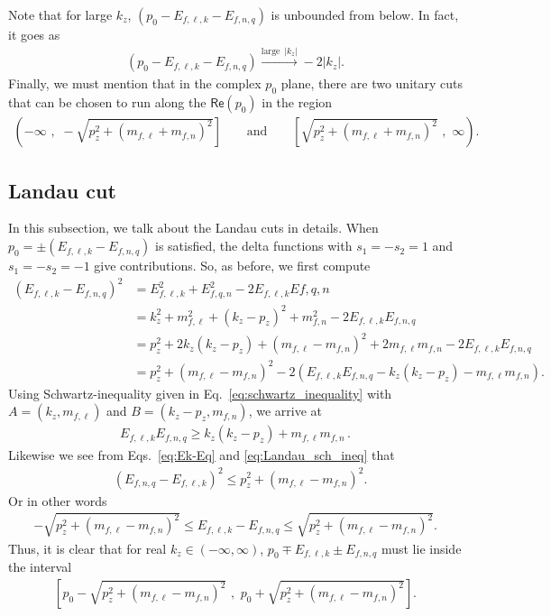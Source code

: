 \documentclass[aps,prd,floatfix,showpacs,showkeys,superscriptadress,unsortedaddress,nofootinbib,onecolumn]{revtex4-1}
\newcommand{\nn}{\nonumber \\}
\begin{document}
Note that for large  $k_z$, $(p_0-E_{f,\ell,k}-E_{f,n,q})$ is unbounded from below.  In fact,  it goes as
\begin{align}
(p_0 - E_{f,\ell,k}-E_{f,n,q}) \xrightarrow{\text{large }\,|k_z|} -2|k_z|.
\end{align} 
Finally,  we must mention that in the complex $p_0$ plane, there are two unitary cuts that can be chosen to run along the $\textsf{Re}(p_0)$ in the region 
\begin{align}
\left(\left.-\infty\,\,,\,\,-\sqrt{p^2_z+\left(m_{f,\ell}+m_{f,n}\right)^2}\right.\right]\qquad\text{and}\qquad \left[\left.\sqrt{p^2_z+\left(m_{f,\ell}+m_{f,n}\right)^2}\,\,,\,\,\infty\right.\right).
\end{align} 
\subsection{Landau cut} 
\label{app:landau_cut}
In this subsection, we talk about the Landau cuts in details. When $p_0 = \pm(E_{f,\ell,k}-E_{f,n,q})$ is satisfied, the delta functions with $s_1 =-s_2=1$ and $s_1=-s_2=-1$ give  contributions. So, as before, we first compute
\begin{align}
(E_{f,\ell,k}-E_{f,n,q})^2 &= E_{f,\ell,k}^2+E_{f,q,n}^2-2 E_{f,\ell,k}E{f,q,n} \nn
&= k_z^2+m^2_{f,\ell}+(k_z-p_z)^2+m^2_{f,n}-2 E_{f,\ell,k} E_{f,n,q} \nn
&= p^2_z+2 k_z (k_z-p_z)+(m_{f,\ell}-m_{f,n})^2 + 2m_{f,\ell}m_{f,n}-2 E_{f,\ell,k} E_{f,n,q} \nn
&= p^2_z+(m_{f,\ell}-m_{f,n})^2 - 2 ( E_{f,\ell,k} E_{f,n,q}- k_z (k_z-p_z)-m_{f,\ell}m_{f,n}).
\label{eq:Ek-Eq}
\end{align}
Using Schwartz-inequality given in Eq.~\eqref{eq:schwartz_inequality} with $A=(k_z,m_{f,\ell})$ and $B=(k_z-p_z,m_{f,n})$, we arrive at
\begin{align}
E_{f,\ell,k}E_{f,n,q} \geq k_z (k_z-p_z)+m_{f,\ell}m_{f,n}\,. \label{eq:Landau_sch_ineq}
\end{align}
Likewise   we see from Eqs.~\eqref{eq:Ek-Eq} and \eqref{eq:Landau_sch_ineq} that
\begin{align}
&(E_{f,n,q}-E_{f,\ell,k})^2 \leq p^2_z+(m_{f,\ell}-m_{f,n})^2.
\end{align}
Or in other words
\begin{align}
-\sqrt{p^2_z+(m_{f,\ell}-m_{f,n})^2} \leq E_{f,\ell,k}-E_{f,n,q} \leq \sqrt{p^2_z+(m_{f,\ell}-m_{f,n})^2}.
\end{align}
Thus, it is clear that for real $k_z\in(-\infty,\infty)$, $p_{0}\mp E_{f,\ell,k}\pm E_{f,n,q}$ must lie inside the interval 
\begin{align}
\left[p_0-\sqrt{p^2_z+(m_{f,\ell}-m_{f,n})^2}\,\,,\,\,p_0+\sqrt{p^2_z+(m_{f,\ell}-m_{f,n})^2}\right]. 
\end{align} 
\end{document}
